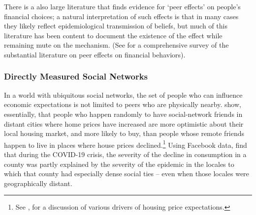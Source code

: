 There is a also large literature that finds evidence for `peer effects' on people's financial choices; a natural interpretation of such effects is that in many cases they likely reflect epidemiological transmission of beliefs, but much of this literature has been content to document the existence of the effect while remaining mute on the mechanism.  (See \cite{kuchler2021social} for a comprehensive survey of the substantial literature on peer effects on financial behaviors).



\subsubsection{Directly Measured Social Networks}

In a world with ubiquitous social networks, the set of people who can influence economic expectations is not limited to peers who are physically nearby.  \href{https://www.journals.uchicago.edu/doi/abs/10.1086/700073}{\cite{bailey2018economic,bailey2019house}} show, essentially, that people who happen randomly to have social-network friends in distant cities where home prices have increased are more optimistic about their local housing market, and more likely to buy, than people whose remote friends happen to live in places where house prices declined.\footnote{See \kpshousingexpectationFull, for a discussion of various drivers of housing price expectations.}  Using Facebook data, \cite{makridis2020learning} find that during the COVID-19 crisis, the severity of the decline in consumption in a county was partly explained by the severity of the epidemic in the locales to which that county had especially dense social ties -- even when those locales were geographically distant.

